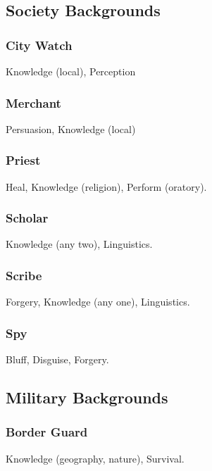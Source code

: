 
\subsection{Society Backgrounds}

\subsubsection{City Watch}
 Knowledge (local), Perception

\subsubsection{Merchant}
 Persuasion, Knowledge (local)

\subsubsection{Priest}
 Heal, Knowledge (religion), Perform (oratory).

\subsubsection{Scholar}
 Knowledge (any two), Linguistics.

\subsubsection{Scribe}
 Forgery, Knowledge (any one), Linguistics.

\subsubsection{Spy}
 Bluff, Disguise, Forgery.

\subsection{Military Backgrounds}

\subsubsection{Border Guard}
 Knowledge (geography, nature), Survival.

